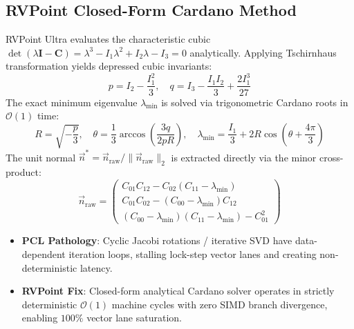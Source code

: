 \documentclass[11pt,a4paper]{article}
\begin{document}
\subsection{RVPoint Closed-Form Cardano Method}
RVPoint Ultra evaluates the characteristic cubic $\det(\lambda \mathbf{I} - \mathbf{C}) = \lambda^3 - I_1\lambda^2 + I_2\lambda - I_3 = 0$ analytically. Applying Tschirnhaus transformation yields depressed cubic invariants:
\begin{equation}
p = I_2 - \frac{I_1^2}{3}, \quad q = I_3 - \frac{I_1 I_2}{3} + \frac{2 I_1^3}{27}
\end{equation}
The exact minimum eigenvalue $\lambda_{\min}$ is solved via trigonometric Cardano roots in $\mathcal{O}(1)$ time:
\begin{equation}
R = \sqrt{-\frac{p}{3}}, \quad \theta = \frac{1}{3} \arccos\left( \frac{3q}{2p R} \right), \quad \lambda_{\min} = \frac{I_1}{3} + 2 R \cos\left( \theta + \frac{4\pi}{3} \right)
\label{eq:cardano_min_root}
\end{equation}
The unit normal $\vec{n}^* = \vec{n}_{\text{raw}} / \|\vec{n}_{\text{raw}}\|_2$ is extracted directly via the minor cross-product:
\begin{equation}
\vec{n}_{\text{raw}} = \begin{pmatrix}
C_{01}C_{12} - C_{02}(C_{11} - \lambda_{\min}) \\
C_{01}C_{02} - (C_{00} - \lambda_{\min})C_{12} \\
(C_{00} - \lambda_{\min})(C_{11} - \lambda_{\min}) - C_{01}^2
\end{pmatrix}
\end{equation}

\begin{tcolorbox}[fixcmp, title={Stage Comparison: Surface Normal Estimation}]
\begin{itemize}[leftmargin=1.2em, itemsep=0.1em]
    \item \textbf{PCL Pathology}: Cyclic Jacobi rotations / iterative SVD have data-dependent iteration loops, stalling lock-step vector lanes and creating non-deterministic latency.
    \item \textbf{RVPoint Fix}: Closed-form analytical Cardano solver operates in strictly deterministic $\mathcal{O}(1)$ machine cycles with zero SIMD branch divergence, enabling $100\%$ vector lane saturation.
\end{itemize}
\end{tcolorbox}

\end{document}
